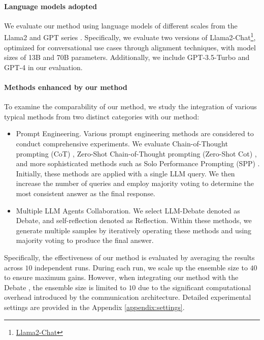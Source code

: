 \paragraph{Language models adopted} 

We evaluate our method using language models of different scales from the Llama2 \cite{llama2} and GPT series \cite{chatgpt}. Specifically, we evaluate two versions of Llama2-Chat\footnote{\href{https://github.com/facebookresearch/llama}{Llama2-Chat}}, optimized for conversational use cases through alignment techniques, with model sizes of 13B and 70B parameters. Additionally, we include GPT-3.5-Turbo and GPT-4 in our evaluation.

\paragraph{Methods enhanced by our method}

To examine the comparability of our method, we study the integration of  various typical methods from two distinct categories with our method: 
\begin{itemize}
    \item Prompt Engineering. Various prompt engineering methods are considered to conduct comprehensive experiments. We evaluate Chain-of-Thought prompting (CoT) \cite{cot}, Zero-Shot Chain-of-Thought prompting (Zero-Shot Cot) \cite{zs-cot}, and more sophisticated methods such as Solo Performance Prompting (SPP) \cite{spp}. Initially, these methods are applied with a single LLM query. We then increase the number of queries and employ majority voting to determine the most consistent answer as the final response. 
    \item Multiple LLM Agents Collaboration. We select LLM-Debate \cite{debate} denoted as Debate, and self-reflection \cite{reflexion} denoted as Reflection. Within these methods, we generate multiple samples by iteratively operating these methods and using majority voting to produce the final answer.
\end{itemize}

Specifically, the effectiveness of our method is evaluated by averaging the results across $10$ independent runs. During each run, we scale up the ensemble size to $40$ to ensure maximum gains. However, when integrating our method with the Debate \cite{debate}, the ensemble size is limited to $10$ due to the significant computational overhead introduced by the communication architecture. Detailed experimental settings are provided in the Appendix \ref{appendix:settings}.






